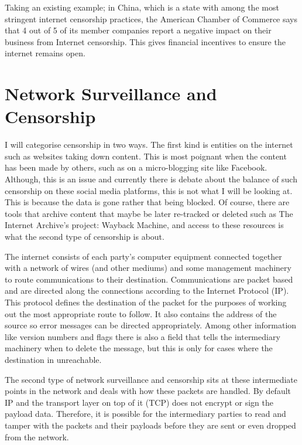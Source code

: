 \documentclass[12pt,a4paper]{article}
\begin{document}
Taking an existing example; in China, which is a state with among the most stringent internet censorship practices, the American Chamber of Commerce\cite{amcham} says that 4 out of 5 of its member companies report a negative impact on their business from Internet censorship. This gives financial incentives to ensure the internet remains open.

\section{Network Surveillance and Censorship}

I will categorise censorship in two ways. The first kind is entities on the internet such as websites taking down content. This is most poignant when the content has been made by others, such as on a micro-blogging site like Facebook. Although, this is an issue and currently there is debate about the balance of such censorship on these social media platforms, this is not what I will be looking at. This is because the data is gone rather that being blocked. Of course, there are tools that archive content that maybe be later re-tracked or deleted such as The Internet Archive's project: Wayback Machine\cite{wb}, and access to these resources is what the second type of censorship is about.

The internet consists of each party's computer equipment connected together with a network of wires (and other mediums) and some management machinery to route communications to their destination.  Communications are packet based and are directed along the connections according to the Internet Protocol (IP)\cite{ip4}. This protocol defines the destination of the packet for the purposes of working out the most appropriate route to follow. It also contains the address of the source so error messages can be directed appropriately. Among other information like version numbers and flags there is also a field that tells the intermediary machinery when to delete the message, but this is only for cases where the destination in unreachable. 

The second type of network surveillance and censorship sits at these intermediate points in the network and deals with how these packets are handled. By default IP and the transport layer on top of it (TCP) does not encrypt or sign the payload data. Therefore, it is possible for the intermediary parties to read and tamper with the packets and their payloads before they are sent or even dropped from the network. 
\end{document}
